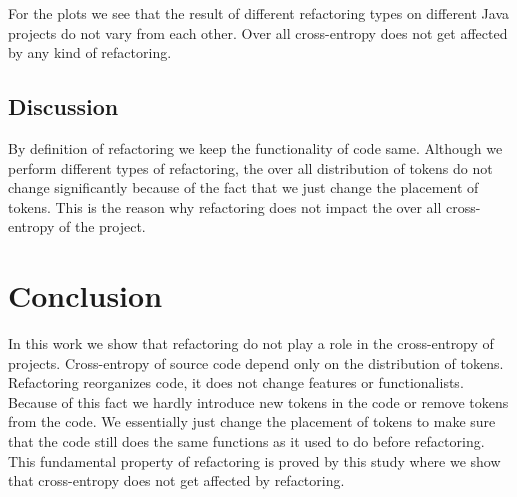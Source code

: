 \documentclass[conference]{IEEEtran}
\begin{document}
For the plots we see that the result of different refactoring types on different Java projects do not vary from each other. Over all cross-entropy does not get affected by any kind of refactoring.

\subsection{Discussion}

By definition of refactoring we keep the functionality of code same. Although we perform different types of refactoring, the over all distribution of tokens do not change significantly because of the fact that we just change the placement of tokens. This is the reason why refactoring does not impact the over all cross-entropy of the project.


\section{Conclusion}
In this work we show that refactoring do not play a role in the cross-entropy of projects. Cross-entropy of source code depend only on the distribution of tokens. Refactoring reorganizes code, it does not change features or functionalists. Because of this fact we hardly introduce new tokens in the code or remove tokens from the code. We essentially just change the placement of tokens to make sure that the code still does the same functions as it used to do before refactoring. This fundamental property of refactoring is proved by this study where we show that cross-entropy does not get affected by refactoring.

%
%
\end{document}
